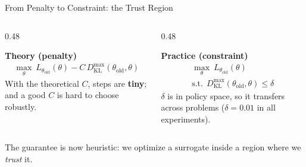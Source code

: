 \documentclass[aspectratio=169]{beamer}
\newcommand{\DKL}{D_{\mathrm{KL}}}
\newcommand{\told}{\theta_{\mathrm{old}}}
\begin{document}
\begin{frame}{From Penalty to Constraint: the Trust Region}
  \begin{columns}[t]
    \begin{column}{0.48\textwidth}
      \begin{warmbox}
        \small\textbf{\color{AtlasWarm}Theory (penalty)}
        \begin{gather*}
          \max_\theta\ L_{\told}(\theta) - C\,\DKL^{\max}(\told,\theta)
        \end{gather*}
        With the theoretical $C$, steps are \textbf{tiny}; and a good $C$ is hard to choose robustly.
      \end{warmbox}
    \end{column}
    \begin{column}{0.48\textwidth}
      \begin{coolbox}
        \small\textbf{\color{AtlasCool}Practice (constraint)}
        \begin{gather*}
          \max_\theta\ L_{\told}(\theta) \\
          \text{s.t.}\ \ \DKL^{\max}(\told,\theta) \le \delta
        \end{gather*}
        $\delta$ is in policy space, so it transfers across problems ($\delta = 0.01$ in all experiments).
      \end{coolbox}
    \end{column}
  \end{columns}

  \vspace{8pt}
  \begin{noteframe}
    \small The guarantee is now heuristic: we optimize a surrogate inside a region where we \emph{trust} it.
  \end{noteframe}
\end{frame}
\end{document}
